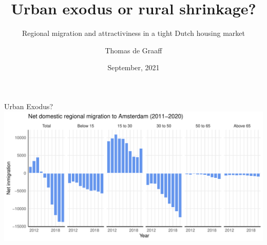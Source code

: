 \documentclass{beamer}
\title{Urban exodus or rural shrinkage?}
\subtitle{Regional migration and attractiviness in a tight Dutch housing market}
\date{September, 2021}
\author{Thomas de Graaff}
\institute{Vrije Universiteit Amsterdam\\Tinbergen Institute Amsterdam}
\begin{document}
\maketitle

\begin{frame}{Urban Exodus?}
	\includegraphics[width=1\textwidth]{../../fig/outmig_amsterdam.pdf}
\end{frame}
\end{document}
